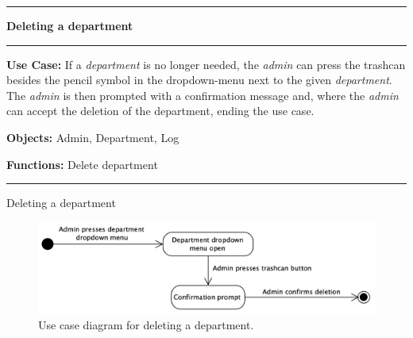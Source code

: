\begin{use_case}[H]
    \hrule
    \vskip 0.3cm
    \Large
    \begin{center}
    
        \textbf{Deleting a department}
        
    \end{center}
    \vskip 0.1cm
    \hrule
    \vskip 0.2cm
    \normalsize
    
    \textbf{Use Case:} If a \textit{department} is no longer needed, the \textit{admin} can press the trashcan besides the pencil symbol in the dropdown-menu next to the given \textit{department}. The \textit{admin} is then prompted with a confirmation message and, where the \textit{admin} can accept the deletion of the department, ending the use case.
    
    \vskip 0.2cm
    
    \textbf{Objects:} Admin, Department, Log
    
    \vskip 0.2cm
    
    \textbf{Functions:} Delete department
    
    \vskip 0.4cm
    \hrule
    \vskip 0.2cm
    \caption{Deleting a department} \label{use_case:deleting_a_department}
\end{use_case}

\begin{figure}[H]
    \centering
    \includegraphics[width=1.0\textwidth]{figures/DeleteDepartment.png}
    \caption{Use case diagram for deleting a department.}
    \label{fig:UseCaseDeleteDepartment}
\end{figure}


